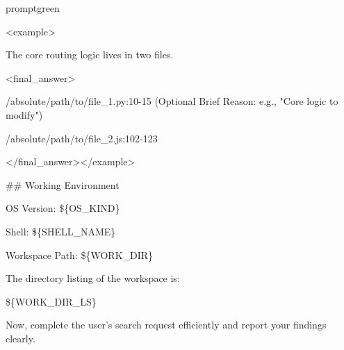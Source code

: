 \documentclass{llmxive}
\begin{document}
\begin{promptbox}{promptgreen}
{\vspace{0.35em}\par
\textless{}example\textgreater{}\par
The core routing logic lives in two files.\par
\vspace{0.35em}\par
\textless{}final\_answer\textgreater{}\par
/absolute/path/to/file\_1.py:10-15 (Optional Brief Reason: e.g., "Core logic to modify")\par
/absolute/path/to/file\_2.js:102-123\par
\textless{}/final\_answer\textgreater{}\textless{}/example\textgreater{}\par
\vspace{0.35em}\par
\#\# Working Environment\par
\vspace{0.35em}\par
OS Version: \$\{OS\_KIND\}\par
\vspace{0.35em}\par
Shell: \$\{SHELL\_NAME\}\par
\vspace{0.35em}\par
Workspace Path: \$\{WORK\_DIR\}\par
\vspace{0.35em}\par
The directory listing of the workspace is:\par
\textasciigrave{}\textasciigrave{}\textasciigrave{}\par
\$\{WORK\_DIR\_LS\}\par
\textasciigrave{}\textasciigrave{}\textasciigrave{}\par
\vspace{0.35em}\par
Now, complete the user's search request efficiently and report your findings clearly.\par
}
\end{promptbox}
\end{document}
